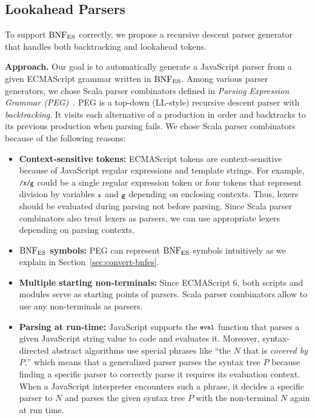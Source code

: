 \subsection{Lookahead Parsers}
To support \( \text{BNF}_{\text{ES}} \) correctly, we propose a recursive descent
parser generator that handles both backtracking and lookahead tokens.

\smallskip

\textbf{Approach.} 
Our goal is to automatically generate a JavaScript parser from a given
ECMAScript grammar written in \( \text{BNF}_{\text{ES}} \).  Among various parser
generators, we chose Scala parser combinators defined in
\textit{Parsing Expression Grammar (PEG)}~\cite{peg}.
PEG is a top-down (LL-style) recursive descent parser with
\textit{backtracking}.  It visits each alternative of a production in
order and backtracks to its previous production when parsing fails.
We chose Scala parser combinators because of the following reasons:

\begin{itemize}[leftmargin=0.5cm]
\item \textbf{Context-sensitive tokens:} ECMAScript tokens are
context-sensitive because of JavaScript regular expressions and
template strings.  For example, \( \texttt{\footnotesize/x/g} \) could be a single
regular expression token or four tokens that represent division by
variables \( \texttt{\footnotesize x} \) and \( \texttt{\footnotesize g} \) depending on enclosing
contexts.  Thus, lexers should be evaluated during parsing not before
parsing.  Since Scala parser combinators also treat lexers as parsers,
we can use appropriate lexers depending on parsing contexts.
\item \textbf{\( \text{BNF}_{\text{ES}} \) symbols:} PEG can represent \( \text{BNF}_{\text{ES}} \)
symbols intuitively as we explain in Section~\ref{sec:convert-bnfes}.
\item \textbf{Multiple starting non-terminals:} Since ECMAScript 6,
both scripts and modules serve as starting points of parsers.  Scala
parser combinators allow to use any non-terminals as parsers.
\item \textbf{Parsing at run-time:} JavaScript supports the \( \texttt{\footnotesize eval} \)
function that parses a given JavaScript string value to code and
evaluates it.  Moreover, syntax-directed abstract algorithms use special
phrases like ``the \( N \) that is \textit{covered by} \( P \),'' which
means that a generalized parser parses the syntax tree \( P \) because
finding a specific parser to correctly parse it requires its
evaluation context.  When a JavaScript interpreter encounters such a
phrase, it decides a specific parser to \( N \) and parses the given
syntax tree \( P \) with the non-terminal \( N \) again at run time.
\end{itemize}

